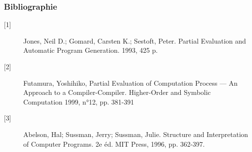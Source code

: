 \documentclass[mathserif]{beamer}
\begin{document}
\begin{frame}
\frametitle{Bibliographie}
\begin{description}

\item[{[1]}] Jones, Neil D.; Gomard, Carsten K.; Sestoft, Peter. Partial Evaluation and Automatic Program Generation. 1993, 425 p.
\item[{[2]}] Futamura, Yoshihiko, Partial Evaluation of Computation Process — An Approach to a Compiler-Compiler. Higher-Order and Symbolic Computation 1999, n°12, pp. 381-391
\item[{[3]}] Abelson, Hal; Sussman, Jerry; Sussman, Julie. Structure and Interpretation of Computer Programs. 2e éd. MIT Press, 1996, pp. 362-397.

\end{description}
\end{frame}
\end{document}
